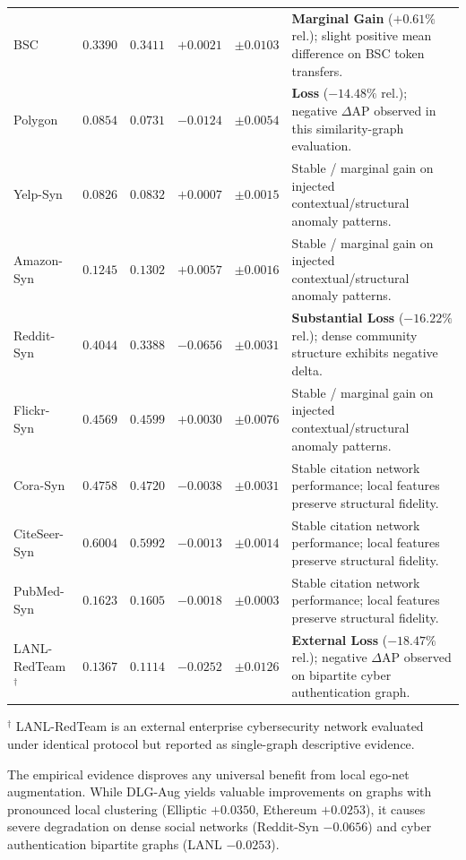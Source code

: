 \documentclass[applsci,article,submit,moreauthors,pdftex]{Definitions/mdpi}
\begin{document}
\begin{table}[htbp]
\begin{tabularx}{\textwidth}{lrrrr>{\raggedright\arraybackslash}X}
BSC & $0.3390$ & $0.3411$ & $+0.0021$ & $\pm 0.0103$ & \textbf{Marginal Gain} ($+0.61\%$ rel.); slight positive mean difference on BSC token transfers. \\
Polygon & $0.0854$ & $0.0731$ & $-0.0124$ & $\pm 0.0054$ & \textbf{Loss} ($-14.48\%$ rel.); negative $\Delta\mathrm{AP}$ observed in this similarity-graph evaluation. \\
Yelp-Syn & $0.0826$ & $0.0832$ & $+0.0007$ & $\pm 0.0015$ & Stable / marginal gain on injected contextual/structural anomaly patterns. \\
Amazon-Syn & $0.1245$ & $0.1302$ & $+0.0057$ & $\pm 0.0016$ & Stable / marginal gain on injected contextual/structural anomaly patterns. \\
Reddit-Syn & $0.4044$ & $0.3388$ & $\mathbf{-0.0656}$ & $\pm 0.0031$ & \textbf{Substantial Loss} ($-16.22\%$ rel.); dense community structure exhibits negative delta. \\
Flickr-Syn & $0.4569$ & $0.4599$ & $+0.0030$ & $\pm 0.0076$ & Stable / marginal gain on injected contextual/structural anomaly patterns. \\
Cora-Syn & $0.4758$ & $0.4720$ & $-0.0038$ & $\pm 0.0031$ & Stable citation network performance; local features preserve structural fidelity. \\
CiteSeer-Syn & $0.6004$ & $0.5992$ & $-0.0013$ & $\pm 0.0014$ & Stable citation network performance; local features preserve structural fidelity. \\
PubMed-Syn & $0.1623$ & $0.1605$ & $-0.0018$ & $\pm 0.0003$ & Stable citation network performance; local features preserve structural fidelity. \\
LANL-RedTeam$^{\dagger}$ & $0.1367$ & $0.1114$ & $-0.0252$ & $\pm 0.0126$ & \textbf{External Loss} ($-18.47\%$ rel.); negative $\Delta\mathrm{AP}$ observed on bipartite cyber authentication graph. \\
\bottomrule
\end{tabularx}
\begin{tablenotes}\footnotesize
\item $^{\dagger}$ LANL-RedTeam is an external enterprise cybersecurity network evaluated under identical protocol but reported as single-graph descriptive evidence.
\end{tablenotes}
\end{table}


The empirical evidence disproves any universal benefit from local ego-net augmentation. While DLG-Aug yields valuable improvements on graphs with pronounced local clustering (Elliptic $+0.0350$, Ethereum $+0.0253$), it causes severe degradation on dense social networks (Reddit-Syn $-0.0656$) and cyber authentication bipartite graphs (LANL $-0.0253$).
\end{document}
